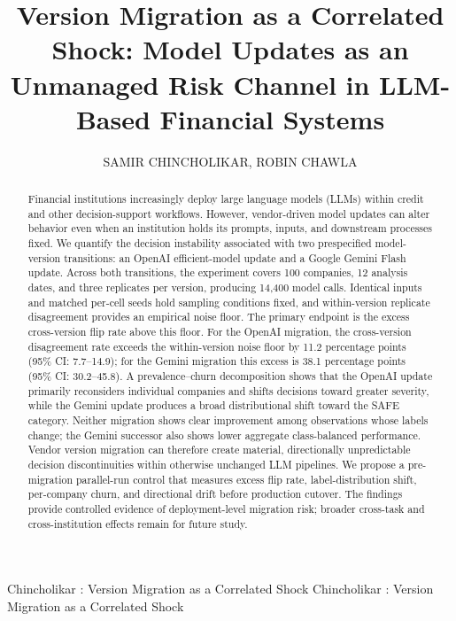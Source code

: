 \documentclass{ieeeaccess}
\begin{document}

\title{Version Migration as a Correlated Shock: Model Updates as an Unmanaged Risk Channel in LLM-Based Financial Systems}

\author{\uppercase{Samir Chincholikar},
\uppercase{Robin Chawla}}
\address[1]{Independent Researcher (e-mail: samir.chincholikar@gmail.com, ORCID: 0009-0007-2779-3492; robin.chawla.cse14@iitbhu.ac.in, ORCID: 0009-0007-2807-3948)}

\markboth
{Chincholikar \headeretal: Version Migration as a Correlated Shock}
{Chincholikar \headeretal: Version Migration as a Correlated Shock}


\begin{abstract}
Financial institutions increasingly deploy large language models (LLMs) within credit and other decision-support workflows. However, vendor-driven model updates can alter behavior even when an institution holds its prompts, inputs, and downstream processes fixed. We quantify the decision instability associated with two prespecified model-version transitions: an OpenAI efficient-model update and a Google Gemini Flash update. Across both transitions, the experiment covers 100 companies, 12 analysis dates, and three replicates per version, producing 14,400 model calls. Identical inputs and matched per-cell seeds hold sampling conditions fixed, and within-version replicate disagreement provides an empirical noise floor. The primary endpoint is the excess cross-version flip rate above this floor. For the OpenAI migration, the cross-version disagreement rate exceeds the within-version noise floor by 11.2 percentage points (95\% CI: 7.7--14.9); for the Gemini migration this excess is 38.1 percentage points (95\% CI: 30.2--45.8). A prevalence--churn decomposition shows that the OpenAI update primarily reconsiders individual companies and shifts decisions toward greater severity, while the Gemini update produces a broad distributional shift toward the SAFE category. Neither migration shows clear improvement among observations whose labels change; the Gemini successor also shows lower aggregate class-balanced performance. Vendor version migration can therefore create material, directionally unpredictable decision discontinuities within otherwise unchanged LLM pipelines. We propose a pre-migration parallel-run control that measures excess flip rate, label-distribution shift, per-company churn, and directional drift before production cutover. The findings provide controlled evidence of deployment-level migration risk; broader cross-task and cross-institution effects remain for future study.
\end{abstract}
\end{document}
